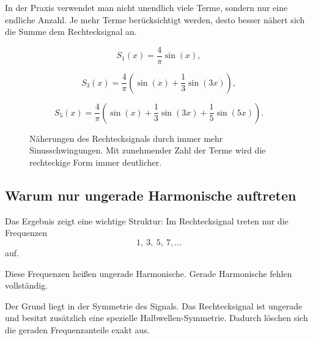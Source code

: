 In der Praxis verwendet man nicht unendlich viele Terme,
sondern nur eine endliche Anzahl.
Je mehr Terme berücksichtigt werden,
desto besser nähert sich die Summe dem Rechtecksignal an.

\[
S_1(x)=\frac{4}{\pi}\sin(x),
\]

\[
S_3(x)=\frac{4}{\pi}
\left(
\sin(x)+\frac{1}{3}\sin(3x)
\right),
\]

\[
S_5(x)=\frac{4}{\pi}
\left(
\sin(x)+\frac{1}{3}\sin(3x)+\frac{1}{5}\sin(5x)
\right).
\]

\begin{figure}[htbp]
	\centering
	\caption{Näherungen des Rechtecksignals durch immer mehr Sinusschwingungen.
		Mit zunehmender Zahl der Terme wird die rechteckige Form immer deutlicher.}
	\label{fig:rechtecksignal_fourier_naeherung}
\end{figure}

\subsection{Warum nur ungerade Harmonische auftreten}

Das Ergebnis zeigt eine wichtige Struktur:
Im Rechtecksignal treten nur die Frequenzen
\[
1,\ 3,\ 5,\ 7,\ldots
\]
auf.

Diese Frequenzen heißen ungerade Harmonische.
Gerade Harmonische fehlen vollständig.

Der Grund liegt in der Symmetrie des Signals.
Das Rechtecksignal ist ungerade und besitzt zusätzlich eine spezielle Halbwellen-Symmetrie.
Dadurch löschen sich die geraden Frequenzanteile exakt aus.

